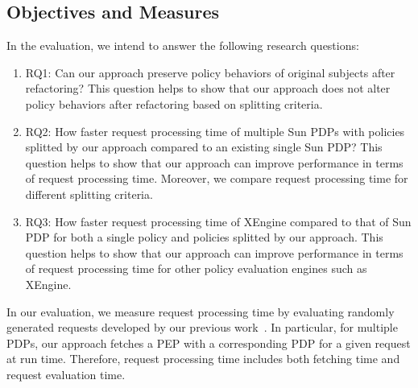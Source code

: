\subsection{Objectives and Measures}
In the evaluation, we intend to answer the following
research questions:
\begin{enumerate}
	\item RQ1: Can our approach preserve policy behaviors of original subjects after refactoring?
This question helps to show that our
approach does not alter policy behaviors after refactoring based on splitting criteria.

	\item RQ2: How faster request processing time of multiple Sun PDPs with policies splitted by our approach compared
to an existing single Sun PDP? This question helps to show that our
approach can improve performance in terms of request processing time. Moreover, we
compare request processing time for different splitting criteria.

	\item RQ3:  How faster request processing time of XEngine compared
to that of Sun PDP for both a single policy and policies splitted by our approach.
This question helps to show that our approach can improve performance in terms of request processing time
for other policy evaluation engines such as XEngine.
\end{enumerate}
In our evaluation, we measure request processing time by evaluating randomly
generated requests developed by our previous work~\cite{Xengine}.
In particular, for multiple PDPs, our approach fetches a PEP with a corresponding
PDP for a given request at run time. Therefore, request processing time includes
both fetching time and request evaluation time.


